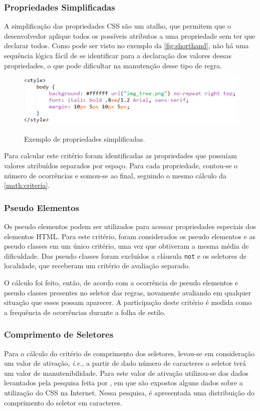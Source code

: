 \subsubsection{Propriedades Simplificadas}
A simplificação das propriedades CSS são um atalho, que permitem que o desenvolvedor aplique todos os possíveis atributos a uma propriedade sem ter que declarar todos. Como pode ser visto no exemplo da \autoref{fig:shorthand}, não há uma sequência lógica fácil de se identificar para a declaração dos valores dessas propriedades, o que pode dificultar na manutenção desse tipo de regra.

\begin{figure}[!htb]
	\centering
	\caption{Exemplo de propriedades simplificadas.}
	\includegraphics[width=1\textwidth]{./04-figuras/shorthand_prop}
	\label{fig:shorthand}
\end{figure}

Para calcular este critério foram identificadas as propriedades que possuíam valores atribuídos separados por espaço. Para cada propriedade, contou-se o número de ocorrências e somou-se ao final, seguindo o mesmo cálculo da \autoref{math:criteria}.

\subsubsection{Pseudo Elementos}
Os pseudo elementos podem ser utilizados para acessar propriedades especiais dos elementos HTML. Para este critério, foram considerados os pseudo elementos e as pseudo classes em um único critério, uma vez que obtiveram a mesma média de dificuldade. Das pseudo classes foram excluídos a cláusula \texttt{not} e os seletores de localidade, que receberam um critério de avaliação separado.

O cálculo foi feito, então, de acordo com a ocorrência de pseudo elementos e pseudo classes presentes no seletor das regras, novamente avaliando em qualquer situação que esses possam aparecer. A participação deste critério é medida como a frequência de ocorrências durante a folha de estilo.

\subsubsection{Comprimento de Seletores}
Para o cálculo do critério de comprimento dos seletores, levou-se em consideração um valor de ativação, \textit{i.e.}, a partir de dado número de caracteres o seletor terá um valor de manutenibilidade. Para este valor de ativação utilizou-se dos dados levantados pela pesquisa feita por , em que são expostos alguns dados sobre a utilização do CSS na Internet. Nessa pesquisa, é apresentada uma distribuição do comprimento do seletor em caracteres. 

